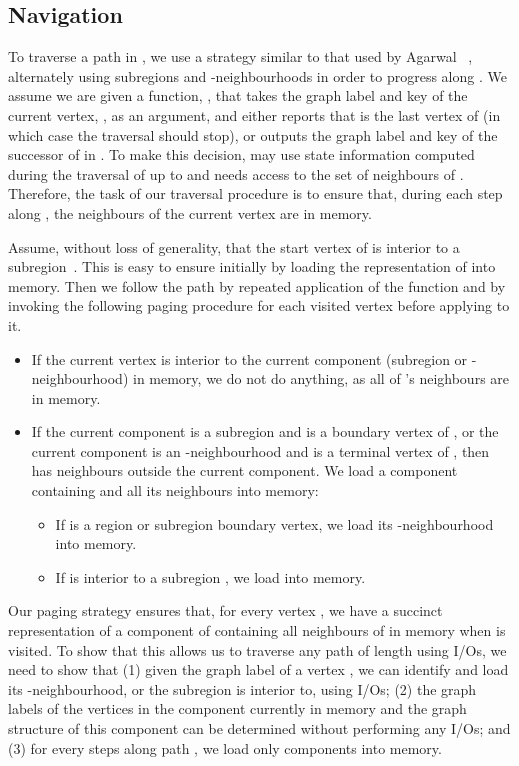 \subsection{Navigation}


\label{sec:navigation}

To traverse a path  in , we use a strategy similar to that used 
by Agarwal \etal~\cite{DBLP:conf/soda/AgarwalAMVV98},
alternately using subregions and -neighbourhoods in order to
progress along .
We assume we are given a function, , that takes the graph label
and key of the current vertex, , as an argument, and either reports that 
is the last vertex of  (in which case the traversal should stop), or outputs
the graph label and key of the successor of  in .
To make this decision,  may
use state information computed during the traversal of  up to 
and needs access to the set of neighbours of .
Therefore, the task of our traversal procedure is to ensure that, during each step
along , the neighbours of the current vertex are in memory.

Assume, without loss of generality, that the start vertex of  is 
interior to a
subregion~.
This is easy to ensure initially by loading the
representation of  into memory.
Then we follow the path  by repeated application of the  function
and by invoking the following paging procedure for each visited vertex before
applying  to it.
\begin{itemize}
\item If the current vertex  is interior to the current component
  (subregion or -neighbourhood) in memory, we do not do
  anything, as all of 's neighbours are in memory.
\item If the current component is a subregion  and  is a
  boundary vertex of , or the current component is an
  -neighbourhood  and  is a terminal vertex of
  , then  has neighbours outside the current
  component.
  We load a component containing  and all its neighbours into memory:
  \begin{itemize}
  \item If  is a region or subregion boundary vertex, we load its
    -neighbourhood  into memory.
  \item If  is interior to a subregion , we load
     into memory.
  \end{itemize}
\end{itemize}

Our paging strategy ensures that, for every vertex , we have
a succinct representation of a component of  containing all
neighbours of  in memory when  is visited.
To show that this allows us to traverse any path of length 
using  I/Os, we need to show that
(1) given the graph label of a vertex , we can identify and load its
-neighbourhood, or the subregion  is interior to, using 
I/Os; (2) the graph labels of the vertices in the component currently
in memory and the graph structure of this component
can be determined without performing any I/Os; and (3) for every
 steps along path , we load only  components into memory.

